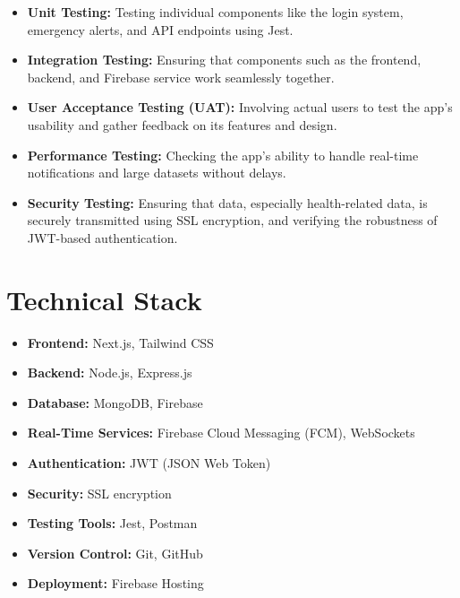 \documentclass[a4paper, 12pt]{article} %
\begin{document}
\begin{itemize}
    \item \textbf{Unit Testing:} Testing individual components like the login system, emergency alerts, and API endpoints using Jest.
    \item \textbf{Integration Testing:} Ensuring that components such as the frontend, backend, and Firebase service work seamlessly together.
    \item \textbf{User Acceptance Testing (UAT):} Involving actual users to test the app’s usability and gather feedback on its features and design.
    \item \textbf{Performance Testing:} Checking the app's ability to handle real-time notifications and large datasets without delays.
    \item \textbf{Security Testing:} Ensuring that data, especially health-related data, is securely transmitted using SSL encryption, and verifying the robustness of JWT-based authentication.
\end{itemize}

\section{\textbf{\LARGE Technical Stack}}

\begin{itemize}
    \item \textbf{Frontend:} Next.js, Tailwind CSS
    \item \textbf{Backend:} Node.js, Express.js
    \item \textbf{Database:} MongoDB, Firebase
    \item \textbf{Real-Time Services:} Firebase Cloud Messaging (FCM), WebSockets
    \item \textbf{Authentication:} JWT (JSON Web Token)
    \item \textbf{Security:} SSL encryption
    \item \textbf{Testing Tools:} Jest, Postman
    \item \textbf{Version Control:} Git, GitHub
    \item \textbf{Deployment:} Firebase Hosting
\end{itemize}
\end{document}
